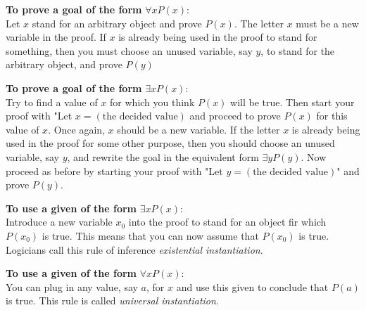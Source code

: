 \textbf{To prove a goal of the form} $\forall x P(x)$:\\
Let $x$ stand for an arbitrary object and prove $P(x)$. The letter $x$ must be a new variable in the proof. If $x$ is already being used in the proof to stand for something, then you must choose an unused variable, say $y$, to stand for the arbitrary object, and prove $P(y)$

\textbf{To prove a goal of the form} $\exists x P(x)$:\\
Try to find a value of $x$ for which you think $P(x)$ will be true. Then start your proof with "Let $x = (\text{the decided value})$ and proceed to prove $P(x)$ for this value of $x$. Once again, $x$ should be a new variable. If the letter $x$ is already being used in the proof for some other purpose, then you should choose an unused variable, say $y$, and rewrite the goal in the equivalent form $\exists y P(y)$. Now proceed as before by starting your proof with "Let $y = (\text{the decided value})$" and prove $P(y)$.

\textbf{To use a given of the form} $\exists x P(x)$:\\
Introduce a new variable $x_0$ into the proof to stand for an object fir which $P(x_0)$ is true. This means that you can now assume that $P(x_0)$ is true. Logicians call this rule of inference \textit{existential instantiation}.

\textbf{To use a given of the form} $\forall x P(x)$: \\
You can plug in any value, say $a$, for $x$ and use this given to conclude that $P(a)$ is true. This rule is called \textit{universal instantiation}.

